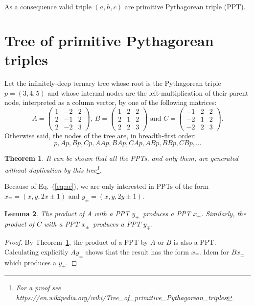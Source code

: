 \documentclass[11pt, twoside, a4paper]{article}
\newtheorem{theorem}{Theorem}[section]
\newtheorem{lemma}[theorem]{Lemma}
\theoremstyle{definition}
\newcommand{\Eq}[1]{Eq.~(\ref{eq:#1})}
\newcommand{\Th}[1]{Theorem~\ref{th:#1}}
\newcommand{\xpm}{\ensuremath{x_\pm}}
\newcommand{\xmp}{\ensuremath{x_\mp}}
\newcommand{\ypm}{\ensuremath{y_\pm}}
\newcommand{\ymp}{\ensuremath{y_\mp}}
\begin{document}
As a consequence valid triple $(a, h, c)$ are primitive Pythagorean triple (PPT).

\section{Tree of primitive Pythagorean triples}
Let the infinitely-deep ternary tree whose root is the Pythagorean triple $p=(3, 4, 5)$ and whose internal nodes are the left-multiplication of their parent node, interpreted as a column vector, by one of the following matrices:
		\[
		A = \left(\begin{matrix}  1 & -2 & 2 \\  2 & -1 & 2 \\  2 & -2 & 3 \end{matrix} \right)\!,\ 
		B = \left(\begin{matrix}  1 &  2 & 2 \\  2 &  1 & 2 \\  2 &  2 & 3 \end{matrix} \right)\!\text{ and }
		C = \left(\begin{matrix} -1 &  2 & 2 \\ -2 &  1 & 2 \\ -2 &  2 & 3 \end{matrix} \right)\!.
		\]
Otherwise said, the nodes of the tree are, in breadth-first order:
\[p, Ap, Bp, Cp, A\!Ap, B\!Ap, C\!Ap, A\!Bp, B\!Bp, C\!Bp, \ldots\] 

\begin{theorem}\label{th:tree}
It can be shown that all the PPTs, and only them, are generated without duplication by this tree\footnote{For a proof see https://en.wikipedia.org/wiki/Tree\_of\_primitive\_Pythagorean\_triples}.
\end{theorem}
    
Because of \Eq{ac}, we are only interested in PPTs of the form $\xmp\!=\!(x, y, 2x\!\pm\!1)$ and $\ypm\!=\!(x, y, 2y\!\pm\!1)$.
\begin{lemma}
The product of $A$ with a PPT \ypm\ produces a PPT \xmp. Similarly, the product of $C$ with a PPT \xpm\ produces a PPT \ymp.
\end{lemma}
\begin{proof}
By \Th{tree}, the product of a PPT by $A$ or $B$ is also a PPT. Calculating explicitly $A \ypm$ shows that the result has the form \xmp. Idem for $B \xpm$ which produces a \ymp.
\end{proof}
\end{document}
